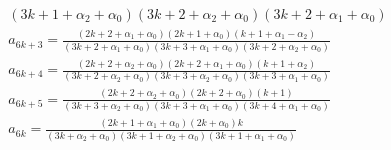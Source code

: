 \begin{teor}
$$\begin{array}{lllllllllllllll}
{(3k+1+\alpha_2+\alpha_0)(3k+2+\alpha_2+\alpha_0)(3k+2+\alpha_1+\alpha_0)}
\\
a_{6k+3}=\displaystyle\frac
{(2k+2+\alpha_1+\alpha_0)(2k+1+\alpha_0)(k+1+\alpha_1-\alpha_2)}
{(3k+2+\alpha_1+\alpha_0)(3k+3+\alpha_1+\alpha_0)(3k+2+\alpha_2+\alpha_0)}
\\
a_{6k+4}=\displaystyle\frac
{(2k+2+\alpha_2+\alpha_0)(2k+2+\alpha_1+\alpha_0)(k+1+\alpha_2)}
{(3k+2+\alpha_2+\alpha_0)(3k+3+\alpha_2+\alpha_0)(3k+3+\alpha_1+\alpha_0)}
\\
a_{6k+5}=\displaystyle\frac
{(2k+2+\alpha_2+\alpha_0)(2k+2+\alpha_0)(k+1)}
{(3k+3+\alpha_2+\alpha_0)(3k+3+\alpha_1+\alpha_0)(3k+4+\alpha_1+\alpha_0)}
\\
a_{6k}=\displaystyle\frac {(2k+1+\alpha_1+\alpha_0)(2k+\alpha_0)k}
{(3k+\alpha_2+\alpha_0)(3k+1+\alpha_2+\alpha_0)(3k+1+\alpha_1+\alpha_0)}
\end{array}
$$
\end{teor}
